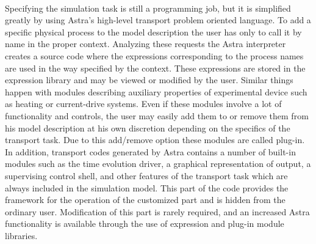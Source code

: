 %
\\[-15pt]
Specifying the simulation task is still a programming job, but it is
simplified greatly by using Astra's high-level transport problem
oriented language. 
To add a specific physical process to the model description the user has
only to call it by name in the proper context. 
Analyzing these requests the Astra interpreter creates a source code
where the expressions corresponding to the process names are used in the
way specified by the context. 
These expressions are stored in the expression library and may be viewed
or modified by the user. 
Similar things happen with modules describing auxiliary properties of
experimental device such as heating or current-drive systems. 
Even if these modules involve a lot of functionality and controls, the
user may easily add them to or remove them from his model description at
his own discretion depending on the specifics of the transport task. 
Due to this add/remove option these modules are called plug-in. 
In addition, transport codes generated by Astra contains a number of
built-in modules such as the time evolution driver, a graphical
representation of output, a supervising control shell, and other features 
of the transport task which are always included in the simulation model.
This part of the code provides the framework for the operation of the
customized part and is hidden from the ordinary user. 
Modification of this part is rarely required, and an increased Astra
functionality is available through the use of expression and plug-in
module libraries. 

